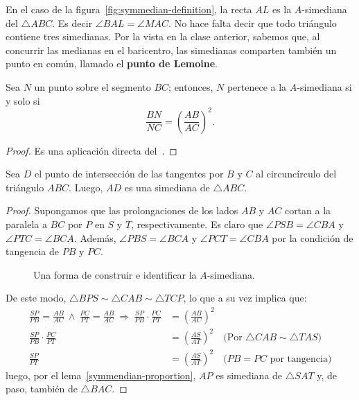 En el caso de la figura~\ref{fig:symmedian-definition}, la recta $AL$ es la $A$-simediana del $\triangle ABC$.
Es decir $\angle BAL = \angle MAC$.
No hace falta decir que todo triángulo contiene tres simedianas.
Por la  vista en la clase anterior, sabemos que, al concurrir las medianas en el baricentro, las simedianas comparten también un punto en común, llamado el \textbf{punto de Lemoine}.


\begin{section-lemma.tcb}\label{symmendian-proportion}
    Sea $N$ un punto sobre el segmento $BC$; entonces, $N$ pertenece a la $A$\nobreakdash-simediana si y solo si
    \[
        \frac{BN}{NC} = \left(\frac{AB}{AC}\right)^2.
    \]
\end{section-lemma.tcb}
\begin{proof}
    Es una aplicación directa del~.
\end{proof}


\begin{section-lemma.tcb}\label{simedian-lemma}
    Sea $D$ el punto de intersección de las tangentes por $B$ y $C$ al circuncírculo del triángulo $ABC$.
    Luego, $AD$ es una simediana de $\triangle ABC$.
\end{section-lemma.tcb}
\begin{proof}
    Supongamos que las prolongaciones de los lados $AB$ y $AC$ cortan a la paralela a $BC$ por $P$ en $S$ y $T$, respectivamente.
    Es claro que $\angle PSB = \angle CBA$ y $\angle PTC = \angle BCA$.
    Además, $\angle PBS = \angle BCA$ y $\angle PCT = \angle CBA$ por la condición de tangencia de $PB$ y $PC$.

    \begin{figure}[H]
        \centering
        
        \caption{Una forma de construir e identificar la $A$-simediana.}
    \end{figure}

    De este modo, $\triangle BPS \sim \triangle CAB \sim \triangle TCP$, lo que a su vez implica que:
    \begin{align*}
        \frac{SP}{PB} = \frac{AB}{AC} \ \land \ \frac{PC}{PT} = \frac{AB}{AC}
        \ \Rightarrow \ \frac{SP}{PB} \cdot \frac{PC}{PT} &= \left(\frac{AB}{AC}\right)^2\\
        \frac{SP}{PB} \cdot \frac{PC}{PT} &= \left(\frac{AS}{AT}\right)^2 \quad \text{(Por $\triangle CAB \sim \triangle TAS$)}\\
        \frac{SP}{PT}  &= \left(\frac{AS}{AT}\right)^2 \quad \text{($PB = PC$ por tangencia)}
    \end{align*}
    luego, por el lema~\ref{symmendian-proportion}, $AP$ es simediana de $\triangle SAT$ y, de paso, también de $\triangle BAC$.
\end{proof}



